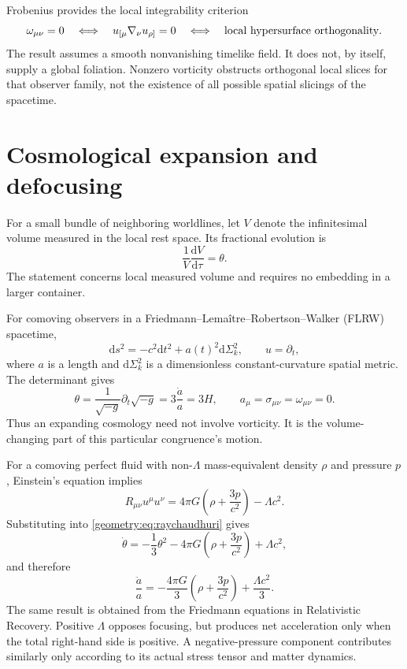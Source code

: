 \documentclass[11pt,oneside]{report}
\newcommand{\dd}{\mathrm d}
\theoremstyle{remark}
\numberwithin{definition}{chapter}
\numberwithin{proposition}{chapter}
\numberwithin{remark}{chapter}
\begin{document}
Frobenius provides the local integrability criterion
\begin{equation}
\omega_{\mu\nu}=0
\quad\Longleftrightarrow\quad
u_{[\mu}\nabla_\nu u_{\rho]}=0
\quad\Longleftrightarrow\quad
\hbox{local hypersurface orthogonality}.
\label{geometry:eq:frobenius}
\end{equation}
The result assumes a smooth nonvanishing timelike field. It does not, by itself, supply a global foliation. Nonzero vorticity obstructs orthogonal local slices for that observer family, not the existence of all possible spatial slicings of the spacetime.

\section{Cosmological expansion and defocusing}
For a small bundle of neighboring worldlines, let $V$ denote the infinitesimal volume measured in the local rest space. Its fractional evolution is
\begin{equation}
\frac{1}{V}\frac{\dd V}{\dd\tau}=\theta.
\label{geometry:eq:volumeexpansion}
\end{equation}
The statement concerns local measured volume and requires no embedding in a larger container.

For comoving observers in a Friedmann--Lema\^itre--Robertson--Walker (FLRW) spacetime,
\begin{equation}
\dd s^2=-c^2\dd t^2+a(t)^2\dd\Sigma_k^2,\qquad u=\partial_t,
\end{equation}
where $a$ is a length and $\dd\Sigma_k^2$ is a dimensionless constant-curvature spatial metric. The determinant gives
\begin{equation}
\theta=\frac{1}{\sqrt{-g}}\partial_t\sqrt{-g}
=3\frac{\dot a}{a}=3H,
\qquad a_\mu=\sigma_{\mu\nu}=\omega_{\mu\nu}=0.
\label{geometry:eq:flrwtheta}
\end{equation}
Thus an expanding cosmology need not involve vorticity. It is the volume-changing part of this particular congruence's motion.

For a comoving perfect fluid with non-$\Lambda$ mass-equivalent density $\rho$ and pressure $p$, Einstein's equation implies
\begin{equation}
R_{\mu\nu}u^\mu u^\nu
=4\pi G\left(\rho+\frac{3p}{c^2}\right)-\Lambda c^2.
\end{equation}
Substituting into \eqref{geometry:eq:raychaudhuri} gives
\begin{equation}
\dot\theta=-\frac13\theta^2
-4\pi G\left(\rho+\frac{3p}{c^2}\right)+\Lambda c^2,
\label{geometry:eq:raychaudhuri_flrw_lambda}
\end{equation}
and therefore
\begin{equation}
\frac{\ddot a}{a}=-\frac{4\pi G}{3}
\left(\rho+\frac{3p}{c^2}\right)+\frac{\Lambda c^2}{3}.
\label{geometry:eq:flrw_accel_lambda}
\end{equation}
The same result is obtained from the Friedmann equations in Relativistic Recovery. Positive $\Lambda$ opposes focusing, but produces net acceleration only when the total right-hand side is positive. A negative-pressure component contributes similarly only according to its actual stress tensor and matter dynamics.
\end{document}
